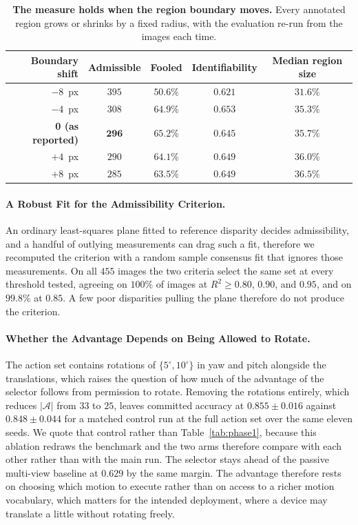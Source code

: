 \documentclass{article} %
\theoremstyle{defstyle}
\theoremstyle{plain}
\begin{document}
\begin{table}[!ht]
\caption{\textbf{The measure holds when the region boundary moves.} Every annotated region
grows or shrinks by a fixed radius, with the evaluation re-run from the images each time.}
\label{tab:supp-mask}
\begin{center}
\footnotesize
\begin{tabular}{rcccc}
\toprule
\textbf{Boundary shift} & \textbf{Admissible} & \textbf{Fooled} &
\textbf{Identifiability} & \textbf{Median region size} \\
\midrule
$-8$~px & $395$ & $50.6\%$ & $0.621$ & $31.6\%$ \\
$-4$~px & $308$ & $64.9\%$ & $0.653$ & $35.3\%$ \\
\textbf{0 (as reported)} & $\mathbf{296}$ & $\mathbf{65.2\%}$ & $\mathbf{0.645}$ & $35.7\%$ \\
$+4$~px & $290$ & $64.1\%$ & $0.649$ & $36.0\%$ \\
$+8$~px & $285$ & $63.5\%$ & $0.649$ & $36.5\%$ \\
\bottomrule
\end{tabular}
\end{center}
\end{table}

\paragraph{A Robust Fit for the Admissibility Criterion.}
An ordinary least-squares plane fitted to reference disparity decides admissibility, and a
handful of outlying measurements can drag such a fit, therefore we recomputed the criterion
with a random sample consensus fit that ignores those measurements. On all $455$ images the
two criteria select the same set at every threshold tested, agreeing on $100\%$ of images at
$R^2 \geq 0.80$, $0.90$, and $0.95$, and on $99.8\%$ at $0.85$. A few poor disparities pulling
the plane therefore do not produce the criterion.

\paragraph{Whether the Advantage Depends on Being Allowed to Rotate.}
The action set contains rotations of $\{5^\circ, 10^\circ\}$ in yaw and pitch alongside the
translations, which raises the question of how much of the advantage of the selector follows
from permission to rotate. Removing the rotations entirely, which reduces $|\mathcal{A}|$ from $33$ to $25$, leaves
committed accuracy at $0.855 \pm 0.016$ against $0.848 \pm 0.044$ for a matched control run
at the full action set over the same eleven seeds. We quote that control rather than
Table~\ref{tab:phase1}, because this ablation redraws the benchmark and the two arms
therefore compare with each other rather than with the main run. The selector stays ahead of
the passive multi-view baseline at $0.629$ by the same margin. The advantage therefore rests
on choosing which motion to execute rather than on access to a richer motion vocabulary,
which matters for the intended deployment, where a device may translate a little without
rotating freely.
\end{document}
